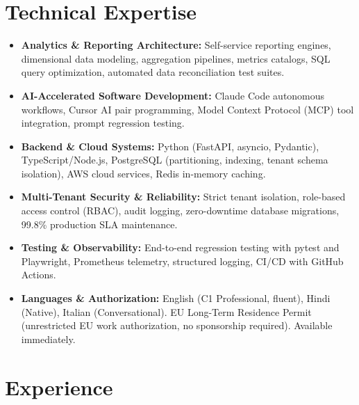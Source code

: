 \documentclass[10pt,a4paper]{article}
\begin{document}
\section{Technical Expertise}
\begin{itemize}
  \item \textbf{Analytics \& Reporting Architecture:} Self-service reporting engines, dimensional data modeling, aggregation pipelines, metrics catalogs, SQL query optimization, automated data reconciliation test suites.
  \item \textbf{AI-Accelerated Software Development:} Claude Code autonomous workflows, Cursor AI pair programming, Model Context Protocol (MCP) tool integration, prompt regression testing.
  \item \textbf{Backend \& Cloud Systems:} Python (FastAPI, asyncio, Pydantic), TypeScript/Node.js, PostgreSQL (partitioning, indexing, tenant schema isolation), AWS cloud services, Redis in-memory caching.
  \item \textbf{Multi-Tenant Security \& Reliability:} Strict tenant isolation, role-based access control (RBAC), audit logging, zero-downtime database migrations, 99.8\% production SLA maintenance.
  \item \textbf{Testing \& Observability:} End-to-end regression testing with pytest and Playwright, Prometheus telemetry, structured logging, CI/CD with GitHub Actions.
  \item \textbf{Languages \& Authorization:} English (C1 Professional, fluent), Hindi (Native), Italian (Conversational). EU Long-Term Residence Permit (unrestricted EU work authorization, no sponsorship required). Available immediately.
\end{itemize}

\section{Experience}
\end{document}

